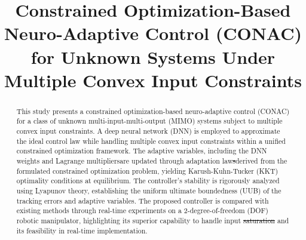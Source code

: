 \documentclass[letterpaper, journal]{IEEEtran}
\newcommand{\version}{0.9.3} %
\providecommand{\DIFadd}[1]{{\protect\color{blue}\uwave{#1}}} %
\providecommand{\DIFdel}[1]{{\protect\color{red}\sout{#1}}} %
\providecommand{\DIFaddbegin}{} %
\providecommand{\DIFaddend}{} %
\providecommand{\DIFdelbegin}{} %
\providecommand{\DIFdelend}{} %
\begin{document}
\DIFaddbegin \linenumbers
\DIFaddend {}

\title{
  Constrained Optimization-Based Neuro-Adaptive Control (CONAC) for Unknown Systems Under Multiple Convex Input Constraints
} %

\author{}


%
{}

\maketitle

\begin{abstract}
  This study presents a constrained optimization-based neuro-adaptive control (CONAC) for a class of unknown multi-input-multi-output (MIMO) systems subject to multiple convex input constraints. 
  A deep neural network (DNN) is employed to approximate the ideal control law while handling multiple convex input constraints within a unified constrained optimization framework.
  The adaptive variables, including the DNN weights and Lagrange multipliers\DIFaddbegin \DIFadd{, }\DIFaddend are updated through adaptation law\DIFdelbegin \DIFdel{s}\DIFdelend  derived from the formulated constrained optimization problem, yielding Karush-Kuhn-Tucker (KKT) optimality conditions at equilibrium.
  The controller's stability is rigorously analyzed using Lyapunov theory, establishing the uniform ultimate boundedness (UUB) of the tracking errors and adaptive variables.
  The proposed controller is compared with existing methods through real-time experiments on a 2-degree-of-freedom (DOF) robotic manipulator, highlighting its superior capability to handle input \DIFdelbegin \DIFdel{saturation }\DIFdelend \DIFaddbegin \DIFadd{constraints }\DIFaddend and its feasibility in real-time implementation.
\end{abstract}
\end{document}
